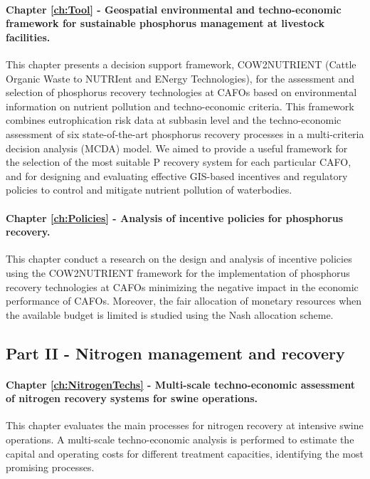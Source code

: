 \begin{refsection}[referencesCh1]
\paragraph{Chapter \ref{ch:Tool} - Geospatial environmental and techno-economic framework for sustainable phosphorus management at livestock facilities.} This chapter presents a decision support framework, COW2NUTRIENT (Cattle Organic Waste to NUTRIent and ENergy Technologies), for the assessment and selection of phosphorus recovery technologies at CAFOs based on environmental information on nutrient pollution and techno-economic criteria. This framework combines eutrophication risk data at subbasin level and the techno-economic assessment of six state-of-the-art phosphorus recovery processes in a multi-criteria decision analysis (MCDA) model. We aimed to provide a useful framework for the selection of the most suitable P recovery system for each particular CAFO, and for designing and evaluating effective GIS-based incentives and regulatory policies to control and mitigate nutrient pollution of waterbodies.

\paragraph{Chapter \ref{ch:Policies} - Analysis of incentive policies for phosphorus recovery.} This chapter conduct a research on the design and analysis of incentive policies using the COW2NUTRIENT framework for the implementation of phosphorus recovery technologies at CAFOs minimizing the negative impact in the economic performance of CAFOs. Moreover, the fair allocation of monetary resources when the available budget is limited is studied using the Nash allocation scheme.

\subsection{Part II - Nitrogen management and recovery}
\paragraph{Chapter \ref{ch:NitrogenTechs} - Multi-scale techno-economic assessment of nitrogen recovery systems for swine operations.} This chapter evaluates the main processes for nitrogen recovery at intensive swine operations. A multi-scale techno-economic analysis is performed to estimate the capital and operating costs for different treatment capacities, identifying the most promising processes.


\end{refsection}
